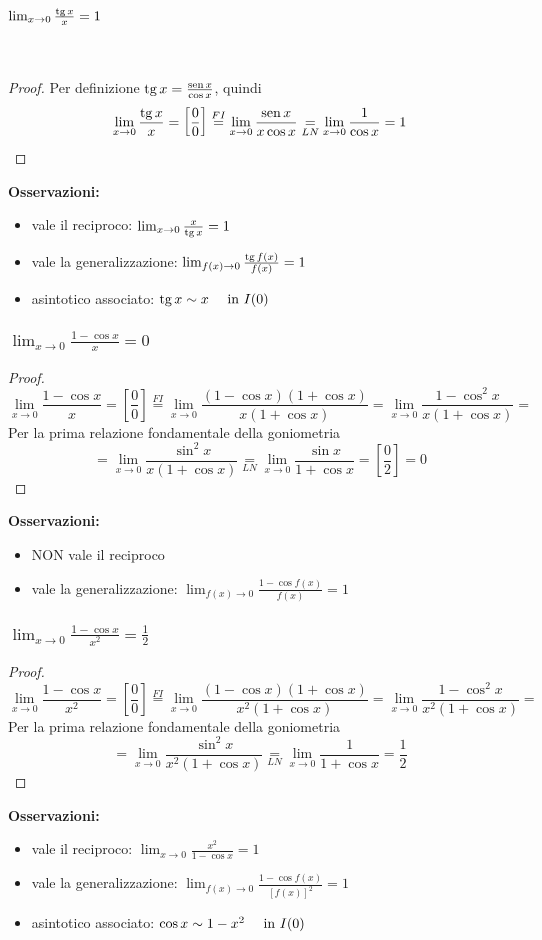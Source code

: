 \documentclass{book}     %
\begin{document}
\paragraph{$\lim_{x\to 0}\frac{\operatorname{tg} x}{x}=1$}~
\\\begin{proof}
    Per definizione $\operatorname{tg} x=\frac{\operatorname{sen} x}{\cos x}$, quindi \[\lim_{x\to 0} \frac{\operatorname{tg} x}{x}=\left[\frac{0}{0}\right]\overset{FI}{=}\lim_{x\to 0} \frac{\operatorname{sen} x}{x \cos x}\underset{LN}{=}\lim_{x\to 0} \frac{1}{\cos x}=1\]
\end{proof}
\textbf{Osservazioni:}
\begin{itemize}
    \item vale il reciproco: $\lim_{x\to 0}\frac{x}{\operatorname{tg} x}=1$
    \item vale la generalizzazione: $\lim_{f(x)\to 0}\frac{\operatorname{tg} f(x)}{f(x)}=1$
    \item asintotico associato: $\operatorname{tg} x \sim x ~~~~\textnormal{in } I(0)$
\end{itemize}

\subsubsection{$\lim_{x\to 0}\frac{1-\cos x}{x}=0$}
\begin{proof}
\[\lim_{x\to 0} \frac{1-\cos x}{x}=\left[\frac{0}{0}\right]\overset{FI}{=}\lim_{x\to 0}\frac{(1-\cos x)(1+\cos x)}{x(1+\cos x)}=\lim_{x\to 0}\frac{1-\cos^2 x}{x(1+\cos x)}=\]Per la prima relazione fondamentale della goniometria\[=\lim_{x\to 0}\frac{\sin^2 x}{x(1+\cos x)}\underset{LN}{=}\lim_{x\to 0}\frac{\sin x}{1+\cos x}=\left[\frac{0}{2}\right]=0\]
\end{proof}
\textbf{Osservazioni:}
\begin{itemize}
    \item NON vale il reciproco
    \item vale la generalizzazione: $\lim_{f(x)\to 0}\frac{1-\cos f(x)}{f(x)}=1$
\end{itemize}

\subsubsection{$\lim_{x\to 0}\frac{1-\cos x}{x^2}=\frac{1}{2}$}
\begin{proof}
\[\lim_{x\to 0} \frac{1-\cos x}{x^2}=\left[\frac{0}{0}\right]\overset{FI}{=}\lim_{x\to 0}\frac{(1-\cos x)(1+\cos x)}{x^2(1+\cos x)}=\lim_{x\to 0}\frac{1-\cos^2 x}{x^2(1+\cos x)}=\]Per la prima relazione fondamentale della goniometria\[=\lim_{x\to 0}\frac{\sin^2 x}{x^2(1+\cos x)}\underset{LN}{=}\lim_{x\to 0}\frac{1}{1+\cos x}=\frac{1}{2}\]
\end{proof}
\textbf{Osservazioni:}
\begin{itemize}
    \item vale il reciproco: $\lim_{x\to 0}\frac{x^2}{1-\cos x}=1$
    \item vale la generalizzazione: $\lim_{f(x)\to 0}\frac{1- \cos f(x)}{[f(x)]^2}=1$
    \item asintotico associato: $\cos x \sim 1 - x^2 ~~~~\textnormal{in } I(0)$
\end{itemize}
\end{document}
